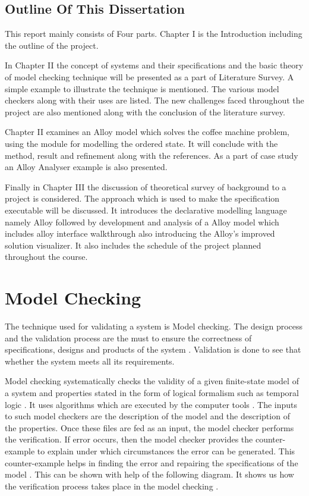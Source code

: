 \documentclass[a4paper,10pt]{report}
\begin{document}
\section{Outline Of This Dissertation}
\label{Outline dissert}

This report mainly consists of Four parts. Chapter I is the Introduction including the outline of the project.

In Chapter II the concept of systems and their specifications and the basic theory of model checking technique will be presented as a part of Literature Survey. A simple example to illustrate the technique is mentioned. The various model checkers along with their uses are listed. The new challenges faced throughout the project are also mentioned along with the conclusion of the literature survey.

Chapter II examines an Alloy model which solves the coffee machine problem, using the module for modelling the ordered state. It will conclude with the method, result and refinement along with the references. As a part of case study an Alloy Analyser example is also presented.

Finally in Chapter III the discussion of theoretical survey of background to a project is considered. The approach which is used to make the specification executable will be discussed. It introduces the declarative modelling language namely Alloy followed by development and analysis of a Alloy model which includes alloy interface walkthrough also introducing the Alloy's improved solution visualizer. It also includes the schedule of the project planned throughout the course.

\chapter{Model Checking}
\label{Model check}

The technique used for validating a system is Model checking. The design process and the validation process are the must to ensure the correctness of specifications, designs and products of the system \cite{ErichGamma1995}. Validation is done to see that whether the system meets all its requirements. 

Model checking systematically checks the validity of a given finite-state model of a system and properties stated in the form of logical formalism such as temporal logic \cite{Palshikar2004}. It uses algorithms which are executed by the computer tools \cite{McMillan2003}. The inputs to such model checkers are the description of the model and the description of the properties. Once these files are fed as an input, the model checker performs the verification. If error occurs, then the model checker provides the counter-example to explain under which circumstances the error can be generated. This counter-example helps in finding the error and repairing the specifications of the model \cite{Wang2007}. This can be shown with help of the following diagram. It shows us how the verification process takes place in the model checking \cite{DanielJackson}.  
\end{document}
